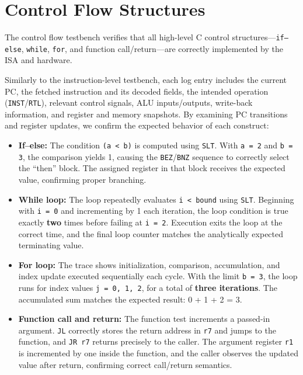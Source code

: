 \documentclass[12pt]{report}
\begin{document}
\section{Control Flow Structures}
The control flow testbench verifies that all high-level C control
structures—\texttt{if--else}, \texttt{while}, \texttt{for}, and function
call/return—are correctly implemented by the ISA and hardware.

Similarly to the instruction-level testbench, each log entry includes the current PC, the fetched instruction and its
decoded fields, the intended operation (\texttt{INST}/\texttt{RTL}), relevant
control signals, ALU inputs/outputs, write-back information, and register and
memory snapshots. By examining PC transitions and
register updates, we confirm the expected behavior of each construct:

\begin{itemize}
    \item \textbf{If--else:}  
          The condition \texttt{(a < b)} is computed using \texttt{SLT}.  
          With \texttt{a = 2} and \texttt{b = 3}, the comparison yields 1,
          causing the \texttt{BEZ}/\texttt{BNZ} sequence to correctly select the
          “then” block. The assigned register in that block receives the expected
          value, confirming proper branching.

    \item \textbf{While loop:}  
          The loop repeatedly evaluates \texttt{i < bound} using \texttt{SLT}.  
          Beginning with \texttt{i = 0} and incrementing by 1 each iteration,
          the loop condition is true exactly \textbf{two} times before failing at
          \texttt{i = 2}.  
          Execution exits the loop at the correct time, and the final loop
          counter matches the analytically expected terminating value.

    \item \textbf{For loop:}  
          The trace shows initialization, comparison, accumulation, and index
          update executed sequentially each cycle.  
          With the limit \texttt{b = 3}, the loop runs for index values  
          \texttt{j = 0, 1, 2}, for a total of \textbf{three iterations}.  
          The accumulated sum matches the expected result: 0 + 1 + 2 = 3.

    \item \textbf{Function call and return:}  
          The function test increments a passed-in argument.  
          \texttt{JL} correctly stores the return address in \texttt{r7} and
          jumps to the function, and \texttt{JR r7} returns precisely to the
          caller.  
          The argument register \texttt{r1} is incremented by one inside the
          function, and the caller observes the updated value after return,
          confirming correct call/return semantics.
\end{itemize}
\end{document}
